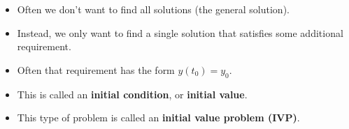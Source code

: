 \begin{frame}
\begin{itemize}
\item  Often we don't want to find all solutions (the general solution).
\item  Instead, we only want to find a single solution that satisfies some additional requirement.
\item  Often that requirement has the form $y(t_0) = y_0$.
\item  This is called an \textbf{initial condition}, or \textbf{initial value}.
\item  This type of problem is called an \textbf{initial value problem (IVP)}.
\end{itemize}
\end{frame}
